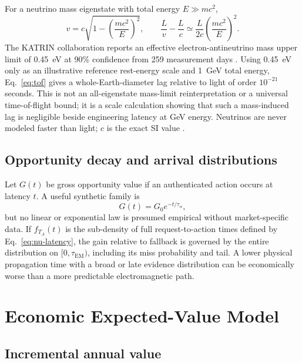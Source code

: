 \documentclass[11pt]{article}
\begin{document}
For a neutrino mass eigenstate with total energy $E\gg mc^2$,
\begin{equation}
v=c\sqrt{1-\left(\frac{mc^2}{E}\right)^2},\qquad
\frac{L}{v}-\frac{L}{c}\simeq\frac{L}{2c}\left(\frac{mc^2}{E}\right)^2.
\label{eq:tof}
\end{equation}
The KATRIN collaboration reports an effective electron-antineutrino mass upper limit of \SI{0.45}{\electronvolt} at 90\% confidence from 259 measurement days \citep{KATRIN2025}. Using \SI{0.45}{\electronvolt} only as an illustrative reference rest-energy scale and \SI{1}{\giga\electronvolt} total energy, Eq.~\eqref{eq:tof} gives a whole-Earth-diameter lag relative to light of order $10^{-21}$ seconds. This is not an all-eigenstate mass-limit reinterpretation or a universal time-of-flight bound; it is a scale calculation showing that such a mass-induced lag is negligible beside engineering latency at GeV energy. Neutrinos are never modeled faster than light; $c$ is the exact SI value \citep{BIPM2019}.

\subsection{Opportunity decay and arrival distributions}

Let $G(t)$ be gross opportunity value if an authenticated action occurs at latency $t$. A useful synthetic family is
\begin{equation}
G(t)=G_0e^{-t/\tau_\alpha},
\end{equation}
but no linear or exponential law is presumed empirical without market-specific data. If $f_{T_A}(t)$ is the sub-density of full request-to-action times defined by Eq.~\eqref{eq:nu-latency}, the gain relative to fallback is governed by the entire distribution on $[0,\tau_{\mathrm{EM}})$, including its miss probability and tail. A lower physical propagation time with a broad or late evidence distribution can be economically worse than a more predictable electromagnetic path.

\section{Economic Expected-Value Model}

\subsection{Incremental annual value}
\end{document}
